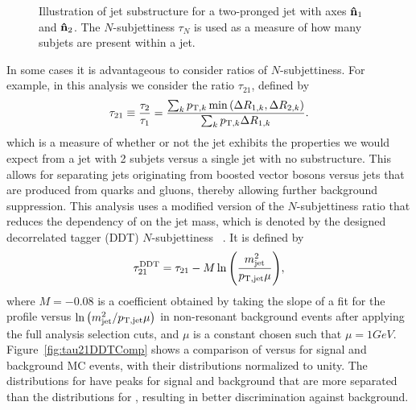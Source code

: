 \begin{figure}[htbp]
  \centering
  
  \caption{
    Illustration of jet substructure for a two-pronged jet with axes $\vb{\hat{n}}_1$ and $\vb{\hat{n}}_2$.
    The $N$-subjettiness $\tau_N$ is used as a measure of how many subjets are present within a jet.
  }
  \label{fig:jetSubstruct}
\end{figure}

In some cases it is advantageous to consider ratios of $N$-subjettiness.
For example, in this analysis we consider the ratio $\tau_{21}$, defined by
\begin{equation}
  \tau_{21}\equiv\frac{\tau_2}{\tau_1}=\frac{\sum_kp_{\mathrm{T},k}\min\pqty{\Delta R_{1,k},\Delta R_{2,k}}}{\sum_kp_{\mathrm{T},k}\Delta R_{1,k}}.
\end{equation}
which is a measure of whether or not the jet exhibits the properties we would expect from a jet with 2 subjets versus a single jet with no substructure.
This allows for separating jets originating from boosted vector bosons versus jets that are produced from quarks and gluons, thereby allowing further background suppression.
This analysis uses a modified version of the $N$-subjettiness ratio that reduces the dependency of \nsubj on the jet mass, which is denoted by the designed decorrelated tagger (DDT) $N$-subjettiness \nsubjDDT~\cite{Dolen_2016}.
It is defined by
\begin{equation}
  \nsubjDDT=\nsubj-M\ln\pqty{\frac{\MJ^2}{\ptjet\mu}},
\end{equation}
where $M=-0.08$ is a coefficient obtained by taking the slope of a fit for the \nsubj profile versus $\ln\pqty{\MJ^2/\ptjet\mu}$ in non-resonant \Wjets background events after applying the full analysis selection cuts, and $\mu$ is a constant chosen such that $\mu=1\unit{GeV}$.
Figure~\ref{fig:tau21DDTComp} shows a comparison of \nsubj versus \nsubjDDT for signal and background MC events, with their distributions normalized to unity.
The distributions for \nsubjDDT have peaks for signal and background that are more separated than the distributions for \nsubj, resulting in better discrimination against background.
